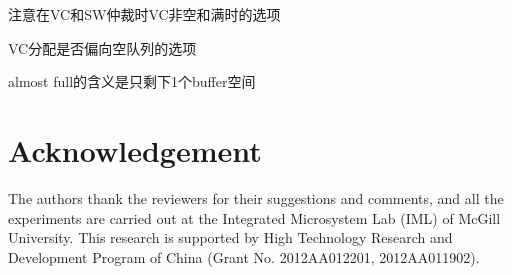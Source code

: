 \documentclass[10pt,journal]{IEEEtran}
\begin{document}
注意在VC和SW仲裁时VC非空和满时的选项

VC分配是否偏向空队列的选项

almost full的含义是只剩下1个buffer空间

\section*{Acknowledgement}
The authors thank the reviewers for their suggestions and comments, and all the experiments are carried out at the Integrated Microsystem Lab (IML) of McGill University. This research is supported by High Technology Research and Development Program of China (Grant No. 2012AA012201, 2012AA011902).



\end{document}
